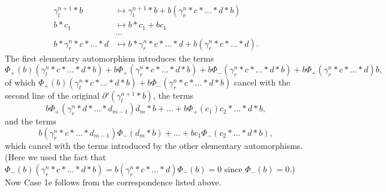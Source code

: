 \documentclass[11pt]{amsart}
\makeatletter
\renewenvironment{proof}[1][\proofname] {\par\pushQED{\qed}{\normalfont\bfseries\topsep6\p@\@plus6\p@\relax #1\@addpunct{.} }}{\popQED\endtrivlist\@endpefalse}
\theoremstyle{mystyle}
\newcommand{\<}{\langle}
\renewcommand{\>}{\rangle}
\makeatother
\begin{document}
\begin{proof}
\begin{align*}
        \gamma_l^{n+1} * b &\mapsto \gamma_l^{n+1} * b + b (\gamma_r^n * c * \dots * d * b) \\
        b * c_1 &\mapsto b * c_1 + b c_1 \\
        &\dots \\
        b * \gamma_r^n * c * \dots * d &\mapsto b * \gamma_r^n * c * \dots * d + b(\gamma_r^n * c * \dots * d).
    \end{align*} The first elementary automorphism introduces the terms \[\Phi_+(b) (\gamma_l^n * c * \dots * d * b) + b \Phi_+(\gamma_r^n * c * \dots * d * b) + b \Phi_-(\gamma_r^n * c * \dots * d * b) + b \Phi_+(\gamma_r^n * c * \dots * d) b,\] of which $\Phi_+(b) (\gamma_l^n * c * \dots * d * b) + b \Phi_-(\gamma_r^n * c * \dots * d * b)$ cancel with the second line of the original $\partial'(\gamma_l^{n+1} * b)$, the terms \[b\Phi_+(\gamma_r^n * d * \dots * d_{m-1}) d_m * b + \dots + b\Phi_+(c_1)c_2 * \dots * d * b,\] and the terms \[b (\gamma_r^n * c * \dots * d_{m-1}) \Phi_-(d_m * b) + \dots + bc_1\Phi_-(c_2 * \dots * d * b),\] which cancel with the terms introduced by the other elementary automorphisms. (Here we used the fact that $\Phi_-(b) (\gamma_r^n * c * \dots * d * b) = b (\gamma_r^n * c * \dots * d) \Phi_-(b) = 0$ since $\Phi_-(b) = 0$.) Now Case 1e follows from the correspondence listed above. \\


\end{proof}
\end{document}
